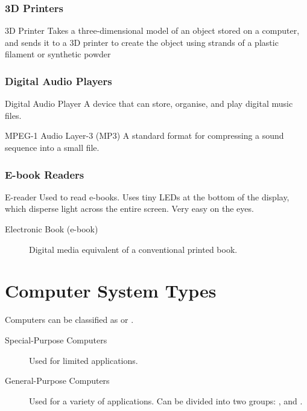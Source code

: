 \documentclass[\main/notes.tex]{subfiles}
\begin{document}
				\subsubsection{3D Printers}
					\begin{definition}{3D Printer}
						Takes a three-dimensional model of an object stored on a computer, and sends it to a 3D printer to create the object using strands of a plastic filament or synthetic powder
					\end{definition}
				\subsubsection{Digital Audio Players}
					\begin{definition}{Digital Audio Player}
						A device that can store, organise, and play digital music files.
					\end{definition}
					\begin{definition}{MPEG-1 Audio Layer-3 (MP3)}
						A standard format for compressing a sound sequence into a small file.
					\end{definition}
				\subsubsection{E-book Readers}
					\begin{definition}{E-reader}
						Used to read e-books. Uses tiny LEDs at the bottom of the display, which disperse light across the entire screen. Very easy on the eyes.
						\begin{description}
							\item[Electronic Book (e-book)] Digital media equivalent of a conventional printed book.
						\end{description}
					\end{definition}

		\section{Computer System Types}
			Computers can be classified as  or .
			\begin{description}
				\item[Special-Purpose Computers] Used for limited applications.
				\item[General-Purpose Computers] Used for a variety of applications. Can be divided into two groups: , and .
			\end{description}
\end{document}
